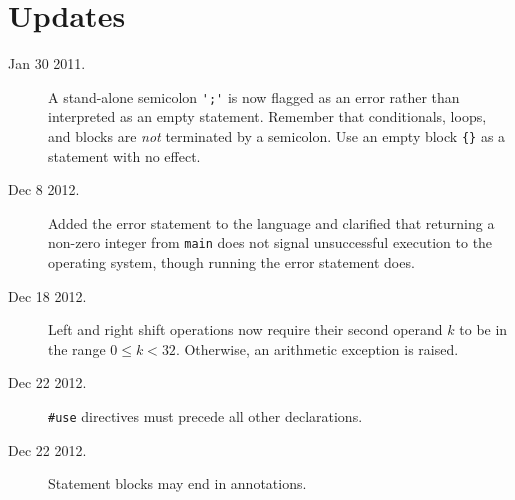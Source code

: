 \documentclass[11pt]{article}
\begin{document}
\section{Updates}
\label{sec:updates}
\hypertarget{sec:updates}{}

\begin{description}
\item[Jan 30 2011.] A stand-alone semicolon \verb"';'" is
  now flagged as an error rather than interpreted as an empty
  statement.  Remember that conditionals, loops, and blocks are
  \emph{not} terminated by a semicolon.  Use an empty block \verb'{}'
  as a statement with no effect.
\item[Dec 8 2012.] Added the error statement to the language and
  clarified that returning a non-zero integer from \verb'main' does
  not signal unsuccessful execution to the operating system, though
  running the error statement does.
\item[Dec 18 2012.] Left and right shift operations now require their
  second operand $k$ to be in the range $0 \leq k < 32$.  Otherwise,
  an arithmetic exception is raised.
\item[Dec 22 2012.] \verb'#use' directives must precede all other
  declarations.
\item[Dec 22 2012.] Statement blocks may end in annotations.
\end{description}
\end{document}
